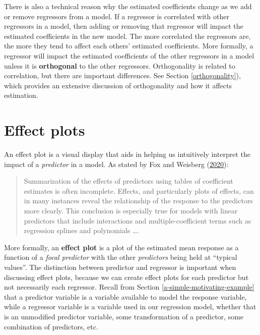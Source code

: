 \documentclass[
]{book}
\theoremstyle{definition}
\theoremstyle{definition}
\theoremstyle{definition}
\theoremstyle{definition}
\theoremstyle{remark}
\begin{document}
There is also a technical reason why the estimated coefficients change
as we add or remove regressors from a model. If a regressor is
correlated with other regressors in a model, then adding or removing
that regressor will impact the estimated coefficients in the new model.
The more correlated the regressors are, the more they tend to affect
each others' estimated coefficients. More formally, a regressor will
impact the estimated coefficients of the other regressors in a model
unless it is \textbf{orthogonal} to the other regressors. Orthogonality is
related to correlation, but there are important differences. See Section
\ref{orthogonality}), which provides an extensive discussion of
orthogonality and how it affects estimation.

\hypertarget{effect-plots}{%
\section{Effect plots}\label{effect-plots}}

An effect plot is a visual display that aids in helping us intuitively
interpret the impact of a \emph{predictor} in a model. As stated by
Fox and Weisberg (\protect\hyperlink{ref-fox2020predictor}{2020}):

\begin{quote}
Summarization of the effects of predictors using tables of coefficient
estimates is often incomplete. Effects, and particularly plots of
effects, can in many instances reveal the relationship of the response
to the predictors more clearly. This conclusion is especially true for
models with linear predictors that include interactions and
multiple-coefficient terms such as regression splines and polynomials
\ldots.
\end{quote}

More formally, an \textbf{effect plot} is a plot of the estimated mean
response as a function of a \emph{focal predictor} with the other
\emph{predictors} being held at ``typical values''. The distinction between
predictor and regressor is important when discussing effect plots,
because we can create effect plots for each predictor but not
necessarily each regressor. Recall from Section
\ref{a-simple-motivating-example} that a predictor variable is a
variable available to model the response variable, while a regressor
variable is a variable used in our regression model, whether that is an
unmodified predictor variable, some transformation of a predictor, some
combination of predictors, etc.
\end{document}
